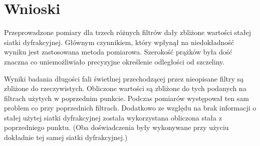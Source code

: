 \documentclass[wide,a4paper,titlepage,12pt]{mwart}
\begin{document}
\clearpage



\section{Wnioski} \label{sec:Wnioski}
    Przeprowadzone pomiary dla trzech różnych filtrów dały zbliżone wartości stałej siatki dyfrakcyjnej. 
Głównym czynnikiem, który wpłynął na niedokładność wyniku jest zastosowana metoda pomiarowa. 
Szerokość prążków była dość znaczna co uniemożliwiało precyzyjne określenie odległości od szczeliny.
	\par
	Wyniki badania długości fali świetlnej przechodzącej przez nieopisane filtry są zbliżone do rzeczywistych. 
	Obliczone wartości są zbliżone do tych podanych na filtrach użytych w poprzednim punkcie. 
	Podczas pomiarów występował ten sam problem co przy poprzednich filtrach. 
	Dodatkowo ze względu na brak informacji o stałej użytej siatki dyfrakcyjnej została wykorzystana obliczona stała z poprzedniego punktu.
	(Oba doświadczenia były wykonywane przy użyciu dokładnie tej samej siatki dyfrakcyjnej.)
\end{document}
